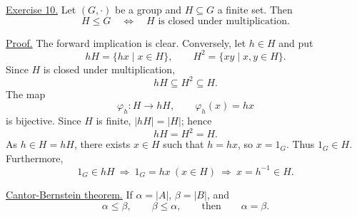 \medskip
\noindent\underline{Exercise 10.}
Let $(G,\cdot)$ be a group and $H\subseteq G$ a finite set. Then
\[
 H\leq G\quad\Longleftrightarrow\quad
 H\text{ is closed under multiplication}.
\]

\noindent\underline{Proof.}
The forward implication is clear. Conversely, let $h\in H$ and put
\[
 hH=\{hx\mid x\in H\},\qquad
 H^2=\{xy\mid x,y\in H\}.
\]
Since $H$ is closed under multiplication,
\[
 hH\subseteq H^2\subseteq H.
\]
The map
\[
 \varphi_h:H\longrightarrow hH,\qquad
 \varphi_h(x)=hx
\]
is bijective. Since $H$ is finite, $|hH|=|H|$; hence
\[
 hH=H^2=H.
\]
As $h\in H=hH$, there exists $x\in H$ such that
$h=hx$, so $x=1_G$. Thus $1_G\in H$. Furthermore,
\[
 1_G\in hH\ \Longrightarrow\
  1_G=hx\ (x\in H)\ \Longrightarrow\
  x=h^{-1}\in H.
\]

\medskip
\noindent\underline{Cantor-Bernstein theorem.}
If $\alpha=|A|$, $\beta=|B|$, and
\[
 \alpha\leq\beta,\qquad\beta\leq\alpha,
 \qquad\text{then}\qquad \alpha=\beta.
\]
